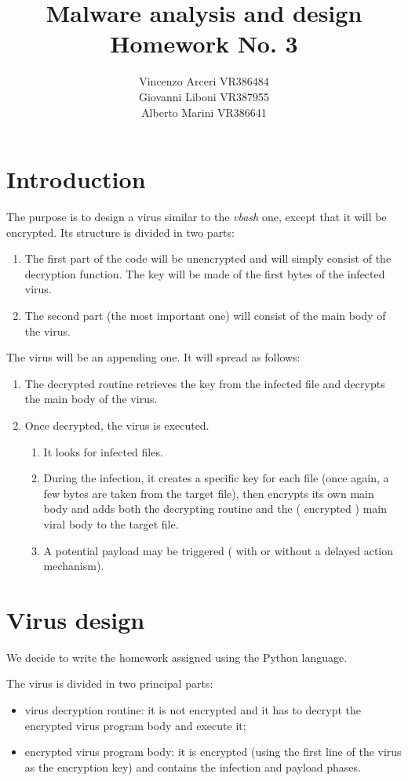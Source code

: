 \documentclass[a4paper,11pt]{article}
\begin{document}
\author{Vincenzo Arceri VR386484 \\ Giovanni Liboni VR387955 \\ Alberto Marini VR386641}
\title{Malware analysis and design \\ Homework No. 3}
\maketitle

\section{Introduction}
The purpose is to design a virus similar to the \textit{vbash} one, except that it will be encrypted. Its structure is divided in two parts:
\begin{enumerate}
\item The first part of the code will be unencrypted and will simply consist of the decryption function. The key will be made of the first bytes of the infected virus.
\item The second part (the most important one) will consist of the main body of the virus.
\end{enumerate}
The virus will be an appending one. It will spread as follows:
\begin{enumerate}
\item The decrypted routine retrieves the key from the infected file and decrypts the main body of the virus.
\item Once decrypted, the virus is executed.
\begin{enumerate}
\item It looks for infected files.
\item During the infection, it creates a specific key for each file (once again, a few bytes are taken from the target file), then encrypts its own main body and adds both the decrypting routine and the ( encrypted ) main viral body to the target file.
\item A potential payload may be triggered ( with or without a delayed action mechanism).
\end{enumerate}
\end{enumerate}
\section{Virus design}
We decide to write the homework assigned using the Python language.

The virus is divided in two principal parts:
\begin{itemize}
\item virus decryption routine: it is not encrypted and it has to decrypt the encrypted virus program body and execute it;
\item encrypted virus program body: it is encrypted (using the first line of the virus as the encryption key) and contains the infection and payload phases.
\end{itemize}
\end{document}
